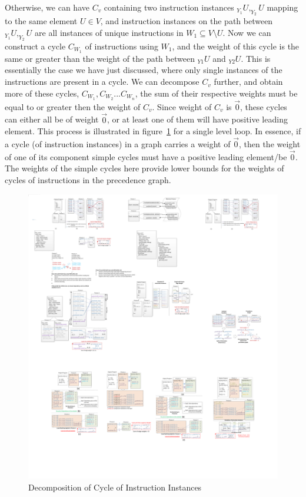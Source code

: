 Otherwise, we can have $C_v$ containing two instruction instances $_{Y_1}U, _{Y_2}U$ mapping to the same element $U \in V$, and instruction instances on the path between $_{Y_1}U, _{Y_2}U$ are all instances of unique instructions in  $W_1 \subseteq  V \setminus U$.  
Now we can construct a cycle $C_{W_1}$ of instructions using $W_1$, and the weight of this cycle is the same or greater than the weight of the path between $_{Y1}U$ and 
$_{Y2}U$. This is essentially the case we have just discussed, where only single instances of
the instructions are present in a cycle. We can decompose $C_v$ further, and obtain more of these cycles,  $C_{W_1}, C_{W_2}...C_{W_n}$, the sum of their respective weights must be equal to or greater then the weight of $C_v$.
Since weight of $C_v$ is  $\vec{0}$, 
these cycles can either all be of weight $\vec{0}$, or at least one of them will have
positive leading element. This process is illustrated in figure~\ref{fig:decomp} for a single level loop. In essence, if a cycle (of instruction instances)
in a graph carries a weight of $\vec{0}$, then the weight of one of its component simple cycles must have a positive leading element/be $\vec{0}$. 
The weights of the simple cycles here provide lower bounds for the weights of cycles of instructions in the precedence graph.

\begin{figure}[htp]
\begin{center}
\includegraphics[width=0.9\linewidth]{chap4fig/decomp2.pdf}
\caption{Decomposition of Cycle of Instruction Instances
\label{fig:decomp}}
\end{center}
\end{figure}



